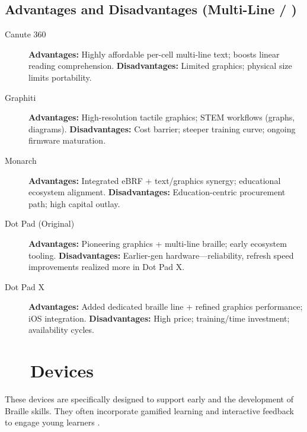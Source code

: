 \subsection*{Advantages and Disadvantages (Multi-Line / )}
\begin{description}
	\item[Canute 360] \textbf{Advantages:} Highly affordable per-cell multi-line text; boosts linear reading comprehension. \textbf{Disadvantages:} Limited graphics; physical size limits portability.
	\item[Graphiti] \textbf{Advantages:} High-resolution tactile graphics; STEM workflows (graphs, diagrams). \textbf{Disadvantages:} Cost barrier; steeper training curve; ongoing firmware maturation.
	\item[Monarch] \textbf{Advantages:} Integrated eBRF + text/graphics synergy; educational ecosystem alignment. \textbf{Disadvantages:} Education-centric procurement path; high capital outlay.
	\item[Dot Pad (Original)] \textbf{Advantages:} Pioneering graphics + multi-line braille; early ecosystem tooling. \textbf{Disadvantages:} Earlier-gen hardware—reliability, refresh speed improvements realized more in Dot Pad X.
	\item[Dot Pad X] \textbf{Advantages:} Added dedicated braille line + refined graphics performance; iOS integration. \textbf{Disadvantages:} High price; training/time investment; availability cycles.
\end{description}


\section{~~ Devices}\label{ch3:sec:braille-ed-devices}
These devices are specifically designed to support early  and the development of Braille skills. They often incorporate gamified learning and interactive feedback to engage young learners \supercite{Lueck2016, Holbrook2006, ThinkerbellLabs}.

